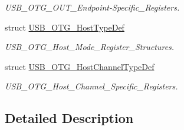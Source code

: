 \begin{DoxyCompactItemize}
\begin{DoxyCompactList}\small\item\em U\+S\+B\+\_\+\+O\+T\+G\+\_\+\+O\+U\+T\+\_\+\+Endpoint-\/\+Specific\+\_\+\+Registers. \end{DoxyCompactList}\item 
struct \hyperlink{struct_u_s_b___o_t_g___host_type_def}{U\+S\+B\+\_\+\+O\+T\+G\+\_\+\+Host\+Type\+Def}
\begin{DoxyCompactList}\small\item\em U\+S\+B\+\_\+\+O\+T\+G\+\_\+\+Host\+\_\+\+Mode\+\_\+\+Register\+\_\+\+Structures. \end{DoxyCompactList}\item 
struct \hyperlink{struct_u_s_b___o_t_g___host_channel_type_def}{U\+S\+B\+\_\+\+O\+T\+G\+\_\+\+Host\+Channel\+Type\+Def}
\begin{DoxyCompactList}\small\item\em U\+S\+B\+\_\+\+O\+T\+G\+\_\+\+Host\+\_\+\+Channel\+\_\+\+Specific\+\_\+\+Registers. \end{DoxyCompactList}\end{DoxyCompactItemize}


\subsection{Detailed Description}
